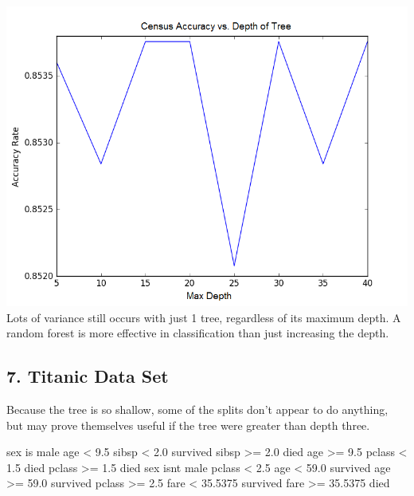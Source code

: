 \documentclass{article}
\begin{document}
\begin{enumerate}[label=\alph*)]
\includegraphics[scale=.6]{figure_1.png}\\
Lots of variance still occurs with just 1 tree, regardless of its maximum depth. A random forest is more effective in classification than just increasing the depth.

\end{enumerate}
\newpage
\subsection*{7. Titanic Data Set}
Because the tree is so shallow, some of the splits don't appear to do anything, but may prove themselves useful if the tree were greater than depth three.
\begin{python}
sex is male
    age < 9.5
        sibsp < 2.0
            survived
        sibsp >= 2.0
            died
    age >= 9.5
        pclass < 1.5
            died
        pclass >= 1.5
            died
sex isnt male
    pclass < 2.5
        age < 59.0
            survived
        age >= 59.0
            survived
    pclass >= 2.5
        fare < 35.5375
            survived
        fare >= 35.5375
            died
\end{python}

\newpage
\end{document}

